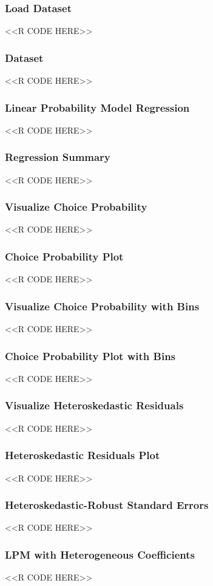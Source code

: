 \documentclass{beamer}
\begin{document}
\begin{frame}[fragile]\frametitle{Load Dataset}
    <<R CODE HERE>>
\end{frame}

\begin{frame}[fragile]\frametitle{Dataset}
    <<R CODE HERE>>
\end{frame}

\begin{frame}[fragile]\frametitle{Linear Probability Model Regression}
    <<R CODE HERE>>
\end{frame}

\begin{frame}[fragile]\frametitle{Regression Summary}
    <<R CODE HERE>>
\end{frame}

\begin{frame}[fragile]\frametitle{Visualize Choice Probability}
    <<R CODE HERE>>
\end{frame}

\begin{frame}[fragile]\frametitle{Choice Probability Plot}
    <<R CODE HERE>>
\end{frame}

\begin{frame}[fragile]\frametitle{Visualize Choice Probability with Bins}
    <<R CODE HERE>>
\end{frame}

\begin{frame}[fragile]\frametitle{Choice Probability Plot with Bins}
    <<R CODE HERE>>
\end{frame}

\begin{frame}[fragile]\frametitle{Visualize Heteroskedastic Residuals}
    <<R CODE HERE>>
\end{frame}

\begin{frame}[fragile]\frametitle{Heteroskedastic Residuals Plot}
    <<R CODE HERE>>
\end{frame}

\begin{frame}[fragile]\frametitle{Heteroskedastic-Robust Standard Errors}
    <<R CODE HERE>>
\end{frame}

\begin{frame}[fragile]\frametitle{LPM with Heterogeneous Coefficients}
    <<R CODE HERE>>
\end{frame}
\end{document}
